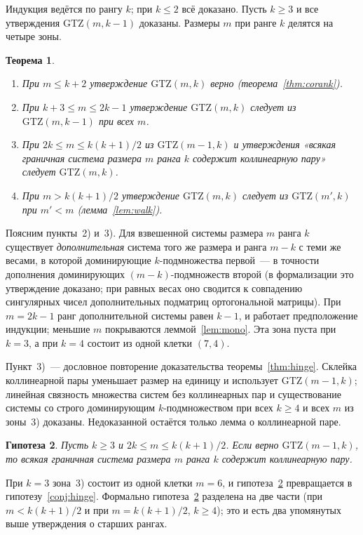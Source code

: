 \documentclass[11pt,a4paper]{article}
\theoremstyle{plain}
\newtheorem{theorem}{Теорема}[section]
\newtheorem{conjecture}[theorem]{Гипотеза}
\theoremstyle{definition}
\theoremstyle{remark}
\newcommand{\GTZ}{\mathrm{GTZ}}
\begin{document}
Индукция ведётся по рангу $k$; при $k\le2$ всё доказано. Пусть $k\ge3$ и
все утверждения $\GTZ(m,k-1)$ доказаны. Размеры $m$ при ранге $k$ делятся на
четыре зоны.

\begin{theorem}\label{thm:zones}
\begin{enumerate}
\item[\textup{1)}] При $m\le k+2$ утверждение $\GTZ(m,k)$ верно
  (теорема~\ref{thm:corank}).
\item[\textup{2)}] При $k+3\le m\le2k-1$ утверждение $\GTZ(m,k)$ следует из
  $\GTZ(m,k-1)$ при всех $m$.
\item[\textup{3)}] При $2k\le m\le k(k+1)/2$ из $\GTZ(m-1,k)$ и утверждения
  «всякая граничная система размера $m$ ранга $k$ содержит коллинеарную
  пару» следует $\GTZ(m,k)$.
\item[\textup{4)}] При $m>k(k+1)/2$ утверждение $\GTZ(m,k)$ следует из
  $\GTZ(m',k)$ при $m'<m$ (лемма~\ref{lem:walk}).
\end{enumerate}
\end{theorem}

Поясним пункты~2) и~3). Для взвешенной системы размера $m$ ранга $k$
существует \emph{дополнительная} система того же размера и ранга $m-k$ с
теми же весами, в которой доминирующие $k$-подмножества первой~--- в точности
дополнения доминирующих $(m-k)$-подмножеств второй (в формализации это
утверждение доказано; при равных весах оно сводится к совпадению сингулярных
чисел дополнительных подматриц ортогональной матрицы). При $m=2k-1$ ранг
дополнительной системы равен $k-1$, и работает предположение индукции;
меньшие $m$ покрываются леммой~\ref{lem:mono}. Эта зона пуста при $k=3$, а
при $k=4$ состоит из одной клетки $(7,4)$.

Пункт~3)~--- дословное повторение доказательства теоремы~\ref{thm:hinge}.
Склейка коллинеарной пары уменьшает размер на единицу и использует
$\GTZ(m-1,k)$; линейная связность множества систем без коллинеарных пар и
существование системы со строго доминирующим $k$-подмножеством при всех
$k\ge4$ и всех $m$ из зоны~3) доказаны. Недоказанной остаётся только лемма о
коллинеарной паре.

\begin{conjecture}\label{conj:window}
Пусть $k\ge3$ и $2k\le m\le k(k+1)/2$. Если верно $\GTZ(m-1,k)$, то всякая
граничная система размера $m$ ранга $k$ содержит коллинеарную пару.
\end{conjecture}

При $k=3$ зона~3) состоит из одной клетки $m=6$, и гипотеза~\ref{conj:window}
превращается в гипотезу~\ref{conj:hinge}. Формально гипотеза~\ref{conj:window}
разделена на две части (при $m<k(k+1)/2$ и при $m=k(k+1)/2$, $k\ge4$); это
и есть два упомянутых выше утверждения о старших рангах.
\end{document}
